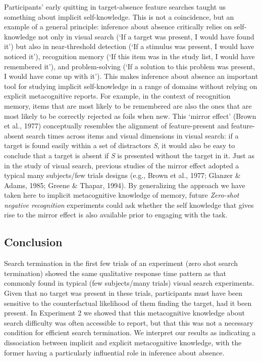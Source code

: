 \documentclass[12pt,twoside]{reedthesis}
\begin{document}
Participants' early quitting in target-absence feature searches taught us something about implicit self-knowledge. This is not a coincidence, but an example of a general principle: inference about absence critically relies on self-knowledge not only in visual search (`If a target was present, I would have found it') but also in near-threshold detection (`If a stimulus was present, I would have noticed it'), recognition memory (`If this item was in the study list, I would have remembered it'), and problem-solving (`If a solution to this problem was present, I would have come up with it'). This makes inference about absence an important tool for studying implicit self-knowledge in a range of domains without relying on explicit metacognitive reports. For example, in the context of recognition memory, items that are most likely to be remembered are also the ones that are most likely to be correctly rejected as foils when new. This `mirror effect' (Brown et al., 1977) conceptually resembles the alignment of feature-present and feature-absent search times across items and visual dimensions in visual search: if a target is found easily within a set of distractors \emph{S}, it would also be easy to conclude that a target is absent if \emph{S} is presented without the target in it. Just as in the study of visual search, previous studies of the mirror effect adopted a typical many subjects/few trials designs (e.g., Brown et al., 1977; Glanzer \& Adams, 1985; Greene \& Thapar, 1994). By generalizing the approach we have taken here to implicit metacognitive knowledge of memory, future \emph{Zero-shot negative recognition} experiments could ask whether the self knowledge that gives rise to the mirror effect is also available prior to engaging with the task.

\hypertarget{conclusion}{%
\subsection{Conclusion}\label{conclusion}}

Search termination in the first few trials of an experiment (zero shot search termination) showed the same qualitative response time pattern as that commonly found in typical (few subjects/many trials) visual search experiments. Given that no target was present in these trials, participants must have been sensitive to the counterfactual likelihood of them finding the target, had it been present. In Experiment 2 we showed that this metacognitive knowledge about search difficulty was often accessible to report, but that this was not a necessary condition for efficient search termination. We interpret our results as indicating a dissociation between implicit and explicit metacognitive knowledge, with the former having a particularly influential role in inference about absence.
\end{document}
